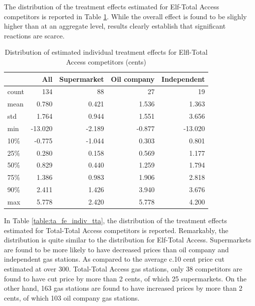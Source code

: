 \documentclass[11pt]{article}
\begin{document}
The distribution of the treatment effects estimated for Elf-Total Access competitors is reported in Table \ref{table:ta_fe_indiv_elf}. While the overall effect is found to be slighly higher than at an aggregate level, results clearly establish that significant reactions are scarce.

\begin{table}[h]
\centering
\caption{Distribution of estimated individual treatment effects for Elfl-Total Access competitors (cents)}
\begin{tabular}{lrrrr}
\toprule
{} &     All &    Supermarket &    Oil company &     Independent \\
\midrule
count & 134 & 88 & 27 &  19 \\
mean  &   0.780 &  0.421 &  1.536 &   1.363 \\
std   &   1.764 &  0.944 &  1.551 &   3.656 \\
min   & -13.020 & -2.189 & -0.877 & -13.020 \\
10\%   &  -0.775 & -1.044 &  0.303 &   0.801 \\
25\%   &   0.280 &  0.158 &  0.569 &   1.177 \\
50\%   &   0.829 &  0.440 &  1.259 &   1.794 \\
75\%   &   1.386 &  0.983 &  1.906 &   2.818 \\
90\%   &   2.411 &  1.426 &  3.940 &   3.676 \\
max   &   5.778 &  2.420 &  5.778 &   4.200 \\
\bottomrule
\end{tabular}
\label{table:ta_fe_indiv_elf}
\end{table}

In Table \ref{table:ta_fe_indiv_tta}, the distribution of the treatment effects estimated for Total-Total Access competitors is reported. Remarkably, the distribution is quite similar to the distribution for Elf-Total Access. Supermarkets are found to be more likely to have decreased prices than oil company and independent gas stations. As compared to the average c.10 cent price cut estimated at over 300. Total-Total Access gas stations, only 38 competitors are found to have cut price by more than 2 cents, of which 25 supermarkets. On the other hand, 163 gas stations are found to have increased prices by more than 2 cents, of which 103 oil company gas stations.
\end{document}
